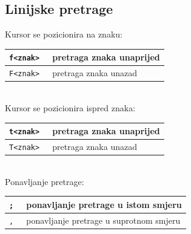 \documentclass[10pt]{article}
\begin{document}
    \subsection*{\color{ForestGreen} Linijske pretrage}
    Kursor se pozicionira na znaku:
    \\
    \begin{tabular}{|>{\tt}p{9.00cm}|>{}p{15.50cm}|}
        \hline
        f<znak>   & pretraga znaka unaprijed            \\ \hline
        F<znak>   & pretraga znaka unazad               \\ \hline
    \end{tabular}
    \\
    Kursor se pozicionira ispred znaka:
    \\
    \begin{tabular}{|>{\tt}p{9.00cm}|>{}p{15.50cm}|}
        \hline
        t<znak>   & pretraga znaka unaprijed            \\ \hline
        T<znak>   & pretraga znaka unazad               \\ \hline
    \end{tabular}
    \\
    Ponavljanje pretrage:
    \\
    \begin{tabular}{|>{\tt}p{9.00cm}|>{}p{15.50cm}|}
        \hline
        ;         & ponavljanje pretrage u istom smjeru         \\ \hline
        ,         & ponavljanje pretrage u suprotnom smjeru     \\ \hline
    \end{tabular}
\end{document}
